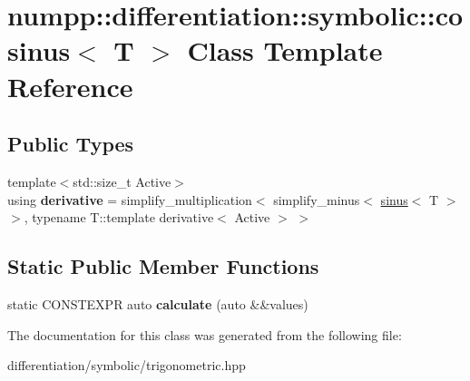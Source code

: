 \hypertarget{classnumpp_1_1differentiation_1_1symbolic_1_1cosinus}{}\section{numpp\+:\+:differentiation\+:\+:symbolic\+:\+:cosinus$<$ T $>$ Class Template Reference}
\label{classnumpp_1_1differentiation_1_1symbolic_1_1cosinus}
\subsection*{Public Types}
\begin{DoxyCompactItemize}
\item 
\mbox{\label{classnumpp_1_1differentiation_1_1symbolic_1_1cosinus_ac171de12cb84da29fc98dc1e346d1236}} 
{\footnotesize template$<$std\+::size\+\_\+t Active$>$ }\\using {\bfseries derivative} = simplify\+\_\+multiplication$<$ simplify\+\_\+minus$<$ \hyperlink{classnumpp_1_1differentiation_1_1symbolic_1_1sinus}{sinus}$<$ T $>$ $>$, typename T\+::template derivative$<$ Active $>$ $>$
\end{DoxyCompactItemize}
\subsection*{Static Public Member Functions}
\begin{DoxyCompactItemize}
\item 
\mbox{\label{classnumpp_1_1differentiation_1_1symbolic_1_1cosinus_a85d5bec924bd6d1d28acdb600f6cb8fb}} 
static C\+O\+N\+S\+T\+E\+X\+PR auto {\bfseries calculate} (auto \&\&values)
\end{DoxyCompactItemize}


The documentation for this class was generated from the following file\+:\begin{DoxyCompactItemize}
\item 
differentiation/symbolic/trigonometric.\+hpp\end{DoxyCompactItemize}

